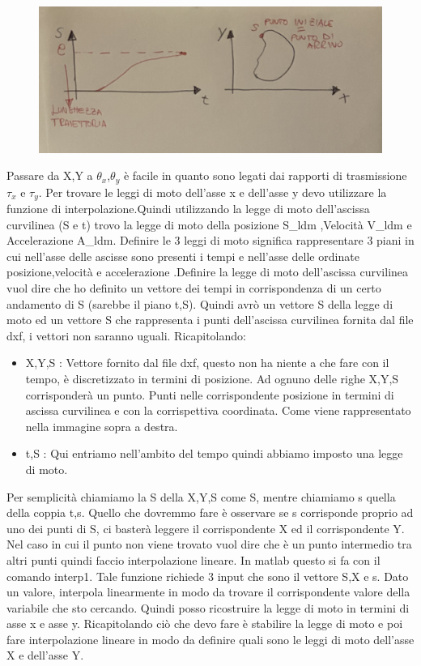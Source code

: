 \documentclass{article}
\begin{document}
\begin{figure}[H]
\centering
\includegraphics[width=.8\textwidth]{./strategia/foto.jpg}
\end{figure}

Passare da X,Y  a $\theta_x$,$\theta_y$ è facile in quanto sono legati dai rapporti di trasmissione $\tau_x$ e $\tau_y$. Per trovare le leggi di moto dell'asse x e dell'asse y devo utilizzare la funzione di interpolazione.Quindi utilizzando la legge di moto dell'ascissa curvilinea (S e t) trovo la legge di moto della posizione S\_ldm ,Velocità V\_ldm e Accelerazione A\_ldm. Definire le  3 leggi di moto significa rappresentare 3 piani in cui nell'asse delle ascisse sono presenti i tempi e nell'asse delle ordinate posizione,velocità e accelerazione .Definire la legge di moto dell'ascissa curvilinea vuol dire che ho definito un vettore dei tempi in corrispondenza di un certo andamento di S (sarebbe il piano t,S). Quindi avrò un vettore S della legge di moto ed un vettore S che rappresenta i punti dell'ascissa curvilinea fornita dal file dxf, i vettori non saranno uguali.
Ricapitolando:
\begin{itemize}
    \item X,Y,S : Vettore fornito dal file dxf, questo non ha niente a che fare con il tempo, è discretizzato in termini di posizione. Ad ognuno delle righe X,Y,S corrisponderà  un punto. Punti nelle corrispondente posizione in termini di ascissa curvilinea e con la corrispettiva coordinata. Come viene rappresentato nella immagine sopra a destra.
    \item t,S : Qui entriamo nell'ambito del tempo quindi abbiamo imposto una legge di moto.
\end{itemize}
    Per semplicità chiamiamo la S della X,Y,S come S, mentre chiamiamo s quella della coppia t,s.
    Quello che dovremmo fare è osservare se  s corrisponde proprio ad uno dei punti di S, ci basterà leggere il corrispondente X ed il corrispondente Y.
    Nel caso in cui il punto non viene trovato vuol dire che è un punto intermedio tra altri punti quindi faccio interpolazione lineare. In matlab questo si fa con il comando interp1. Tale funzione richiede 3 input che sono il vettore S,X e s. Dato un valore, interpola linearmente in modo da trovare il corrispondente  valore della variabile che sto cercando.
    Quindi posso ricostruire la legge di moto in termini di asse x e asse y.
    Ricapitolando ciò che devo fare  è stabilire la legge di moto e poi fare interpolazione lineare in modo da definire quali sono le leggi di moto dell'asse X e dell'asse Y.
    
\end{document}
